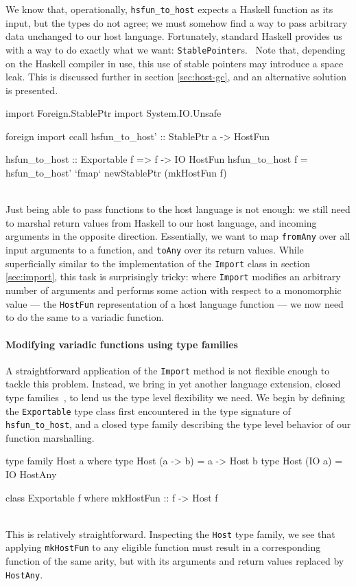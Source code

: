 \documentclass[preprint]{sigplanconf}
\begin{document}
We know that, operationally, \lstinline!hsfun_to_host! expects a Haskell
function as its input, but the types do not agree; we must somehow find a way
to pass arbitrary data unchanged to our host language.
Fortunately, standard Haskell provides us with a way to do exactly what we want:
\lstinline!StablePointer!s.\ \cite{stableptr} Note that, depending on the
Haskell compiler in use, this use of stable pointers may introduce a space
leak. This is discussed further in section \ref{sec:host-gc}, and an
alternative solution is presented.\\
\begin{code}
  import Foreign.StablePtr
  import System.IO.Unsafe

  foreign import ccall
    hsfun_to_host' :: StablePtr a -> HostFun

  hsfun_to_host :: Exportable f => f -> IO HostFun
  hsfun_to_host f =
    hsfun_to_host' `fmap` newStablePtr (mkHostFun f)
\end{code}\\
Just being able to pass functions to the host language is not enough: we still
need to marshal return values from Haskell to our host language, and incoming
arguments in the opposite direction. Essentially, we want to map
\lstinline!fromAny! over all input arguments to a function, and
\lstinline!toAny! over its return values.
While superficially similar to the implementation of the \lstinline!Import!
class in section \ref{sec:import}, this task is surprisingly tricky:
where \lstinline!Import! modifies an arbitrary number of arguments and
performs some action with respect to a monomorphic value --- the
\lstinline!HostFun! representation of a host language function --- we now need
to do the same to a variadic function.

\paragraph{Modifying variadic functions using type families}
A straightforward application of the \lstinline!Import! method is not flexible
enough to tackle this problem. Instead, we bring in yet another language
extension, closed type families\ \cite{closedtypefamilies}, to lend us the type
level flexibility we need. We begin by defining the \lstinline!Exportable!
type class first encountered in the type signature of \lstinline!hsfun_to_host!,
and a closed type family describing the type level behavior of our function
marshalling.\\
\begin{code}
  type family Host a where
    type Host (a -> b) = a -> Host b
    type Host (IO a)   = IO HostAny

  class Exportable f where
    mkHostFun :: f -> Host f
\end{code}\\
This is relatively straightforward. Inspecting the \lstinline!Host! type
family, we see that applying \lstinline!mkHostFun! to any eligible function
must result in a corresponding function of the same arity, but with its
arguments and return values replaced by \lstinline!HostAny!.
\end{document}
